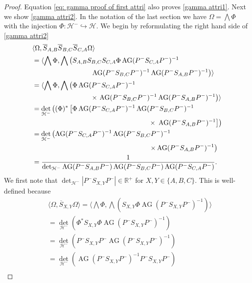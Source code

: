 \documentclass[b5paper,draft,openbib,12pt]{memoir}
\DeclareMathOperator{\AG}{AG}
\begin{document}
\begin{proof}
 Equation 
\eqref{eq: gamma proof of first attri} also proves \eqref{gamma attri1}. Next we show \eqref{gamma attri2}. 
In the notation of the last section we have \(\Omega=\bigwedge \Phi\) 
with the injection \(\Phi: \mathcal{H}^-\hookrightarrow\mathcal{H}\). 
We begin by reformulating the right hand side of  \eqref{gamma attri2}
\begin{align}
 &\langle \Omega, \overline{S}_{A,B} \overline{S}_{B,C} \overline{S}_{C,A}\Omega\rangle \\\notag
&=\langle \bigwedge \Phi, \bigwedge \left(S_{A,B}S_{B,C}S_{C,A}\Phi \AG(P^-S_{C,A} P^-)^{-1}\right.\\\notag
&\hspace{3cm}\left. \AG(P^-S_{B,C} P^-)^{-1} \AG(P^-S_{A,B} P^-)^{-1}  \right)\rangle \\
&=\langle \bigwedge \Phi, \bigwedge \left(\Phi \AG(P^-S_{C,A} P^-)^{-1}\right.\\\notag
&\hspace{3cm}\times\left. \AG(P^-S_{B,C} P^-)^{-1} \AG(P^-S_{A,B} P^-)^{-1}  \right)\rangle \\
&=\det_{\mathcal{H}^-}\left( (\Phi)^*  \left[\Phi \AG(P^- S_{C,A} P^-)^{-1} \AG(P^-S_{B,C} P^-)^{-1}\right.\right.\\\notag
&\hspace{6cm}\times\left.\left. \AG(P^-S_{A,B} P^-)^{-1} \right] \right)\\
&=\det_{\mathcal{H}^-}  \left(\AG(P^- S_{C,A} P^-)^{-1} \AG(P^- S_{B,C} P^-)^{-1}\right.\\ \notag
&\hspace{6cm}\left.\times\AG(P^-S_{A,B} P^-)^{-1}\right)  \\\label{eq:1/arg}
&=\frac{1}{\det_{\mathcal{H}^-}  \AG(P^- S_{A,B} P^-) \AG(P^- S_{B,C} P^-) \AG(P^-S_{C,A} P^-) }.
\end{align}
We first note that \(\det_{\mathcal{H}^-}|P^- S_{X,Y}P^-|\in\mathbb{R}^+\) for \(X,Y\in \{A,B,C\}\). This is well-defined because 
\begin{align}
&\langle \Omega, \overline{S}_{X,Y}\Omega\rangle
=\langle \bigwedge \Phi, \bigwedge(S_{X,Y}\Phi \AG(P^- S_{X,Y}P^-)^{-1})\rangle\\
&=\det_{\mathcal{H}^-} \left( \Phi^* S_{X,Y}\Phi \AG(P^- S_{X,Y}P^-)^{-1}\right)\\
&=\det_{\mathcal{H}^-} \left( P^- S_{X,Y} P^- \AG(P^- S_{X,Y}P^-)^{-1}\right)\\
&=\det_{\mathcal{H}^-} \left(\AG(P^- S_{X,Y}P^-)^{-1} P^- S_{X,Y} P^- \right)\\

\end{align}
\end{proof}
\end{document}
